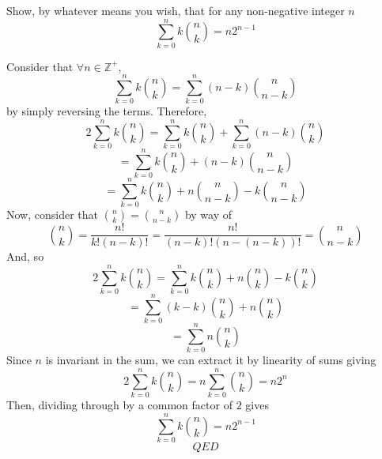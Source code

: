 \documentclass[11pt]{amsart}
\begin{document}
\begin{problem}

Show, by whatever means you wish, that for any non-negative integer $n$
$$ \sum_{k=0}^n k \binom{n}{k} = n 2^{n-1}$$
\end{problem}
\begin{solution}


Consider that $\forall n \in \mathbb{Z}^+$,
$$\sum_{k=0}^{n} k\binom{n}{k} = \sum_{k=0}^{n} (n-k)\binom{n}{n-k}$$
by simply reversing the terms. Therefore,
$$2\sum_{k=0}^{n} k\binom{n}{k} = \sum_{k=0}^{n} k\binom{n}{k} + \sum_{k=0}^{n} (n-k)\binom{n}{k}$$
$$= \sum_{k=0}^{n} k\binom{n}{k} + (n-k)\binom{n}{n-k}$$
$$= \sum_{k=0}^{n} k\binom{n}{k} + n\binom{n}{n-k}  - k\binom{n}{n-k}$$
Now, consider that $\binom{n}{k} = \binom{n}{n-k}$ by way of
$$\binom{n}{k} = \frac{n!}{k!(n-k)!} = \frac{n!}{(n-k)!(n-(n-k))!} = \binom{n}{n-k}$$
And, so
$$2\sum_{k=0}^{n} k\binom{n}{k} = \sum_{k=0}^{n} k\binom{n}{k} + n\binom{n}{k} - k\binom{n}{k}$$
$$= \sum_{k=0}^{n} (k-k)\binom{n}{k} + n\binom{n}{k}$$
$$= \sum_{k=0}^{n} n\binom{n}{k}$$
Since $n$ is invariant in the sum, we can extract it by linearity of sums giving
$$2\sum_{k=0}^{n} k\binom{n}{k} = n\sum_{k=0}^{n} \binom{n}{k} = n 2^n$$
Then, dividing through by a common factor of $2$ gives
$$\sum_{k=0}^{n} k\binom{n}{k} = n 2^{n-1}$$
$$QED$$

\end{solution}
\end{document}
